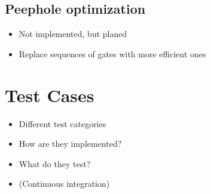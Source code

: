 \subsection{Peephole optimization}
\begin{itemize}
    \item Not implemented, but planed
    \item Replace sequences of gates with more efficient ones
\end{itemize}

\section{Test Cases}
\begin{itemize}
    \item Different test categories
    \item How are they implemented?
    \item What do they test?
    \item (Continuous integration) 
\end{itemize}